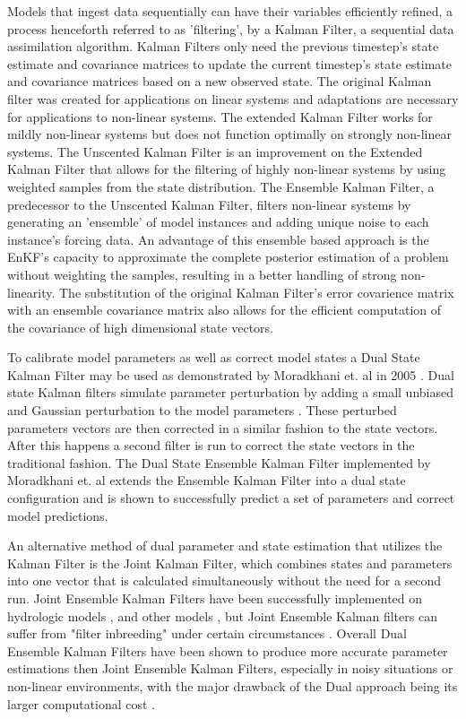 	Models that ingest data sequentially can have their variables efficiently refined, a process henceforth referred to as 'filtering',  by a Kalman Filter, a sequential data assimilation algorithm. Kalman Filters only need the previous timestep's state estimate and covariance matrices to update the current timestep's state estimate and covariance matrices based on a new observed state. The original Kalman filter\cite{Kalman1960} was created for applications on linear systems and adaptations are necessary for applications to non-linear systems. The extended Kalman Filter\cite{Jazwinski1970} works for mildly non-linear systems but does not function optimally on strongly non-linear systems\cite{Miller1994}. The Unscented Kalman Filter\cite{Julier1997} is an improvement on the Extended Kalman Filter that allows for the filtering of highly non-linear systems by using weighted samples from the state distribution. The Ensemble Kalman Filter\cite{Evensen1994}, a predecessor to the Unscented Kalman Filter, filters non-linear systems by generating an 'ensemble' of model instances and adding unique noise to each instance's forcing data. An advantage of this ensemble based approach is the EnKF's capacity to approximate the complete posterior estimation of a problem without weighting the samples, resulting in a better handling of strong non-linearity. The substitution of the original Kalman Filter's error covarience matrix with an ensemble covariance matrix also allows for the efficient computation of the covariance of high dimensional state vectors.
	
	To calibrate model parameters as well as correct model states a Dual State Kalman Filter may be used as demonstrated by Moradkhani et. al in 2005 \cite{Moradkhani2005}. Dual state Kalman filters simulate parameter perturbation by adding a small unbiased and Gaussian perturbation to the model parameters . These perturbed parameters vectors are then corrected in a similar fashion to the state vectors. After this happens a second filter is run to correct the state vectors in the traditional fashion. The Dual State Ensemble Kalman Filter implemented by Moradkhani et. al\cite{Moradkhani2005} extends the Ensemble Kalman Filter into a dual state configuration and is shown to successfully predict a set of parameters and correct model predictions.
	
	An alternative method of dual parameter and state estimation that utilizes the Kalman Filter is the Joint Kalman Filter, which combines states and parameters into one vector that is calculated simultaneously without the need for a second run. Joint Ensemble Kalman Filters have been successfully implemented on hydrologic models \cite{Vrugt2005}, \cite{Xiong2019} and other models \cite{Chen2008}, but Joint Ensemble Kalman filters can suffer from "filter inbreeding" under certain circumstances \cite{HendricksFranssen2008} \cite{Wen2006}. Overall Dual Ensemble Kalman Filters have been shown to produce more accurate parameter estimations then Joint Ensemble Kalman Filters, especially in noisy situations or non-linear environments, with the major drawback of the Dual approach being its larger computational cost \cite{Mariani2005}.

